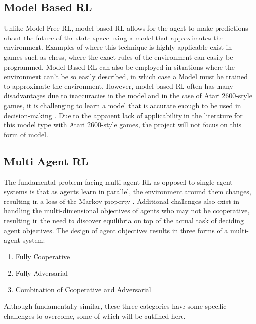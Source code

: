 \documentclass{article}
\begin{document}

\subsection{Model Based RL}

Unlike Model-Free RL, model-based RL allows for the agent to make predictions about the future of the state space using a model that approximates the environment\cite{Huang2020Model-basedLearning}. Examples of where this technique is highly applicable exist in games such as chess, where the exact rules of the environment can easily be programmed. Model-Based RL can also be employed in situations where the environment can't be so easily described, in which case a Model must be trained to approximate the environment. However, model-based RL often has many disadvantages due to inaccuracies in the model and in the case of Atari 2600-style games, it is challenging to learn a model that is accurate enough to be used in decision-making \cite{JannerWhenOptimization}. Due to the apparent lack of applicability in the literature for this model type with Atari 2600-style games, the project will not focus on this form of model. 


\subsection{Multi Agent RL}


The fundamental problem facing multi-agent RL as opposed to single-agent systems is that as agents learn in parallel, the environment around them changes, resulting in a loss of the Markov property \cite{Zhang2019Multi-AgentAlgorithms}. Additional challenges also exist in handling the multi-dimensional objectives of agents who may not be cooperative, resulting in the need to discover equilibria on top of the actual task of deciding agent objectives. The design of agent objectives results in three forms of a multi-agent system:
\begin{enumerate}
    \item Fully Cooperative
    \item Fully Adversarial 
    \item Combination of Cooperative and Adversarial 
\end{enumerate}

Although fundamentally similar, these three categories have some specific challenges to overcome, some of which will be outlined here.
\end{document}
